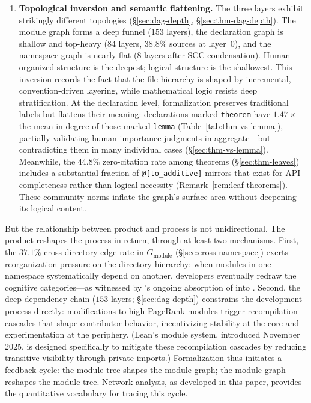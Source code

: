 \begin{enumerate}
\item \textbf{Topological inversion and semantic flattening.} The three layers exhibit strikingly different topologies (\S\ref{sec:dag-depth}, \S\ref{sec:thm-dag-depth}). The module graph forms a deep funnel ($153$ layers), the declaration graph is shallow and top-heavy ($84$ layers, $38.8\%$ sources at layer~$0$), and the namespace graph is nearly flat ($8$ layers after SCC condensation). Human-organized structure is the deepest; logical structure is the shallowest. This inversion records the fact that the file hierarchy is shaped by incremental, convention-driven layering, while mathematical logic resists deep stratification. At the declaration level, formalization preserves traditional labels but flattens their meaning: declarations marked \texttt{theorem} have $1.47\times$ the mean in-degree of those marked \texttt{lemma} (Table~\ref{tab:thm-vs-lemma}), partially validating human importance judgments in aggregate---but contradicting them in many individual cases (\S\ref{sec:thm-vs-lemma}). Meanwhile, the $44.8\%$ zero-citation rate among theorems (\S\ref{sec:thm-leaves}) includes a substantial fraction of \texttt{@[to\_additive]} mirrors that exist for API completeness rather than logical necessity (Remark~\ref{rem:leaf-theorems}). These community norms inflate the graph's surface area without deepening its logical content.
\end{enumerate}

But the relationship between product and process is not unidirectional. The product reshapes the process in return, through at least two mechanisms. First, the $37.1\%$ cross-directory edge rate in $G_{\mathrm{module}}^{-}$ (\S\ref{sec:cross-namespace}) exerts reorganization pressure on the directory hierarchy: when modules in one namespace systematically depend on another, developers eventually redraw the cognitive categories---as witnessed by 's ongoing absorption of  into . Second, the deep dependency chain ($153$ layers; \S\ref{sec:dag-depth}) constrains the development process directly: modifications to high-PageRank modules trigger recompilation cascades that shape contributor behavior, incentivizing stability at the core and experimentation at the periphery. (Lean's module system, introduced November 2025, is designed specifically to mitigate these recompilation cascades by reducing transitive visibility through private imports.) Formalization thus initiates a feedback cycle: the module tree shapes the module graph; the module graph reshapes the module tree. Network analysis, as developed in this paper, provides the quantitative vocabulary for tracing this cycle.


